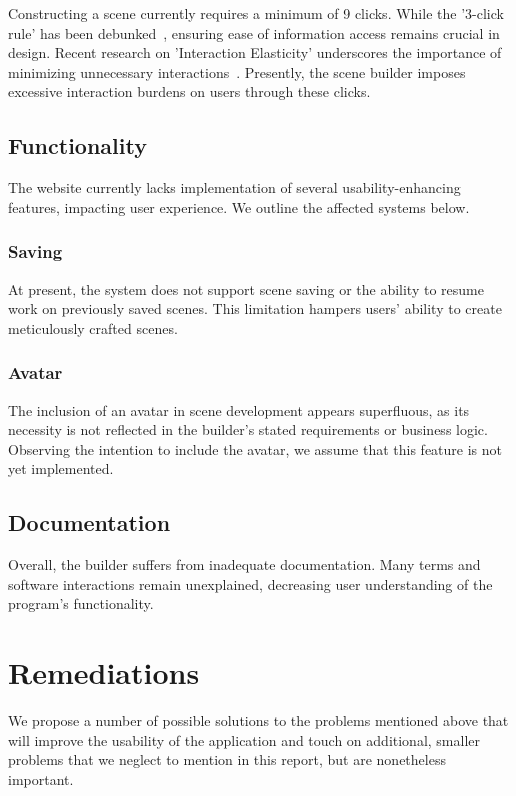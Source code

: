 \documentclass[sigart]{acmart_mod} %
\begin{document}
Constructing a scene currently requires a minimum of 9 clicks. While the '3-click rule' has been debunked~\cite{ThreeclickRule2023}, ensuring ease of information access remains crucial in design. Recent research on 'Interaction Elasticity' underscores the importance of minimizing unnecessary interactions~\cite{experienceInteractionElasticity}. Presently, the scene builder imposes excessive interaction burdens on users through these clicks.

\subsection{Functionality}

The website currently lacks implementation of several usability-enhancing features, impacting user experience. We outline the affected systems below.

\subsubsection{Saving}

At present, the system does not support scene saving or the ability to resume work on previously saved scenes. This limitation hampers users' ability to create meticulously crafted scenes.

\subsubsection{Avatar}

The inclusion of an avatar in scene development appears superfluous, as its necessity is not reflected in the builder's stated requirements or business logic. Observing the intention to include the avatar, we assume that this feature is not yet implemented.

\subsection{Documentation}

Overall, the builder suffers from inadequate documentation. Many terms and software interactions remain unexplained, decreasing user understanding of the program's functionality.

\section{Remediations}\label{remediations}
We propose a number of possible solutions to the problems mentioned above that will improve the usability of the application and touch on additional, smaller problems that we neglect to mention in this report, but are nonetheless important.
\end{document}
